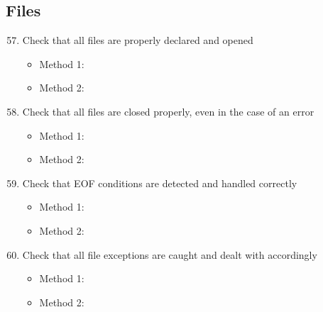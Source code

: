 \subsection{Files}
\begin{enumerate}
	\setcounter{enumi}{56}
	\item Check that all files are properly declared and opened
	\begin{itemize}
		\item Method 1: \cmark
		\item Method 2: \cmark
	\end{itemize}
	\item Check that all files are closed properly, even in the case of an error
	\begin{itemize}
		\item Method 1: \cmark
		\item Method 2: \cmark
	\end{itemize}
	\item Check that EOF conditions are detected and handled correctly
	\begin{itemize}
		\item Method 1: \cmark
		\item Method 2: \cmark
	\end{itemize}
	\item Check that all file exceptions are caught and dealt with accordingly
	\begin{itemize}
		\item Method 1: \cmark
		\item Method 2: \cmark
	\end{itemize}
\end{enumerate}